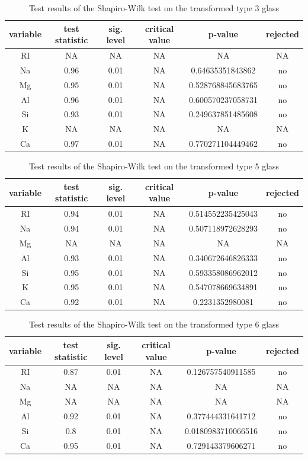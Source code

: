 \documentclass[a4paper, 12pt, titlepage, headsepline, listof = totoc, bibliography = totoc, numbers = noenddot]{scrartcl}
\begin{document}
\begin{appendix}
\begin{table}[h!]
\centering
\begin{tabular}{|cccccc|} \hline variable & test statistic & sig. level & critical value & p-value & rejected\\ \hline RI & NA & NA & NA & NA & NA\\ 
Na & 0.96 & 0.01 & NA & 0.64635351843862 & no\\ 
Mg & 0.95 & 0.01 & NA & 0.528768845683765 & no\\ 
Al & 0.96 & 0.01 & NA & 0.600570237058731 & no\\ 
Si & 0.93 & 0.01 & NA & 0.249637851485608 & no\\ 
K & NA & NA & NA & NA & NA\\ 
Ca & 0.97 & 0.01 & NA & 0.770271104449462 & no\\ \hline \end{tabular}\caption{Test results of the Shapiro-Wilk test on the transformed type 3 glass}
\label{tab:testrestype3SWtrans}
\end{table}

\begin{table}[h!]
\centering
\begin{tabular}{|cccccc|} \hline variable & test statistic & sig. level & critical value & p-value & rejected\\ \hline RI & 0.94 & 0.01 & NA & 0.514552235425043 & no\\ 
Na & 0.94 & 0.01 & NA & 0.507118972628293 & no\\ 
Mg & NA & NA & NA & NA & NA\\ 
Al & 0.93 & 0.01 & NA & 0.340672646826333 & no\\ 
Si & 0.95 & 0.01 & NA & 0.593358086962012 & no\\ 
K & 0.95 & 0.01 & NA & 0.547078669634891 & no\\ 
Ca & 0.92 & 0.01 & NA & 0.2231352980081 & no\\ \hline \end{tabular}\caption{Test results of the Shapiro-Wilk test on the transformed type 5 glass}
\label{tab:testrestype5SWtrans}
\end{table}

\begin{table}[h!]
\centering
\begin{tabular}{|cccccc|} \hline variable & test statistic & sig. level & critical value & p-value & rejected\\ \hline RI & 0.87 & 0.01 & NA & 0.126757540911585 & no\\ 
Na & NA & NA & NA & NA & NA\\ 
Mg & NA & NA & NA & NA & NA\\ 
Al & 0.92 & 0.01 & NA & 0.377444331641712 & no\\ 
Si & 0.8 & 0.01 & NA & 0.0180983710066516 & no\\ 
Ca & 0.95 & 0.01 & NA & 0.729143379606271 & no\\ \hline \end{tabular}\caption{Test results of the Shapiro-Wilk test on the transformed type 6 glass}
\label{tab:testrestype6SWtrans}
\end{table}


\end{appendix}
\end{document}
